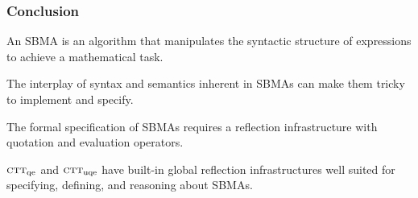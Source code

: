 \documentclass[t,12pt,numbers,fleqn]{beamer}
\newcommand{\churchqe}{$\mbox{\sc ctt}_{\rm qe}$}
\newcommand{\churchuqe}{$\mbox{\sc ctt}_{\rm uqe}$}
\begin{document}

\begin{frame}\label{lastframe}
\frametitle{Conclusion}
\bi

  \item An SBMA is an algorithm that manipulates the syntactic
    structure of expressions to achieve a mathematical task.

  \item The interplay of syntax and semantics inherent in SBMAs can
    make them tricky to implement and specify.

  \item The formal specification of SBMAs requires a reflection
    infrastructure with quotation and evaluation operators.

  \item {\churchqe} and {\churchuqe} have built-in global reflection
    infrastructures well suited for specifying, defining, and
    reasoning about SBMAs.

\ei
\end{frame}
\end{document}
